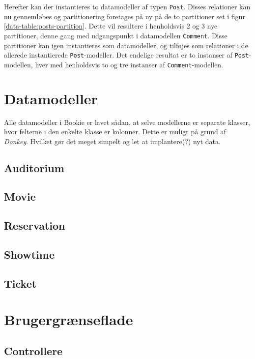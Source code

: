 Herefter kan der instantieres to datamodeller af typen \texttt{Post}. Disses relationer kan nu gennemløbes og partitionering foretages på ny på de to partitioner set i figur \ref{data-table:posts-partition}. Dette vil resultere i henholdsvis 2 og 3 nye partitioner, denne gang med udgangspunkt i datamodellen \texttt{Comment}. Disse partitioner kan igen instantieres som datamodeller, og tilføjes som relationer i de allerede instantierede \texttt{Post}-modeller. Det endelige resultat er to instanser af \texttt{Post}-modellen, hver med henholdsvis to og tre instanser af \texttt{Comment}-modellen.

\section{Datamodeller}
Alle datamodeller i Bookie er lavet sådan, at selve modellerne er separate klasser, hvor felterne i den enkelte klasse er kolonner. Dette er muligt på grund af \textit{Donkey}. Hvilket gør det meget simpelt og let at implantere(?) %
nyt data.

\subsection{Auditorium}


\subsection{Movie}


\subsection{Reservation}


\subsection{Showtime}


\subsection{Ticket}


\section{Brugergrænseflade}


\subsection{Controllere}


